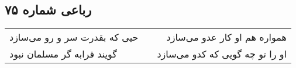 \begin{center}
\section*{رباعی شماره ۷۵}
\label{sec:sh075}
\begin{longtable}{l p{0.5cm} r}
حیی که بقدرت سر و رو می‌سازد
&&
همواره هم او کار عدو می‌سازد
\\
گویند قرابه گر مسلمان نبود
&&
او را تو چه گویی که کدو می‌سازد
\\
\end{longtable}
\end{center}
